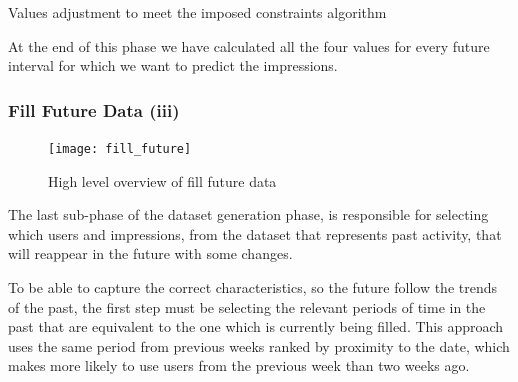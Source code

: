 \begin{algorithm}[H]
  \LinesNumbered
  \BlankLine

  \BlankLine

  \caption[Constraint adjustement for statistics]{
    Values adjustment to meet the imposed constraints algorithm
  }
  \label{alg:adjust_values} \end{algorithm}

At the end of this phase we have calculated all the four
values for every future interval for which we want to predict the impressions.


\subsubsection{Fill Future Data (iii)}\label{subsubsec:fill_data}

\begin{figure}[h] \begin{center} \leavevmode
\texttt{[image: fill\_future]} \caption{ High level overview
of fill future data} \label{fig:fill_future_iii} \end{center} \end{figure}

The last sub-phase of the dataset generation phase, is responsible for selecting
which users and impressions, from the dataset that represents past activity,
that will reappear in the future with some changes.

To be able to capture the correct characteristics, so the future follow the
trends of the past, the first step must be selecting the relevant periods of
time in the past that are equivalent to the one which is currently being filled.
This approach uses the same period from previous weeks ranked by proximity to
the date, which makes more likely to use users from the previous week than two
weeks ago.

